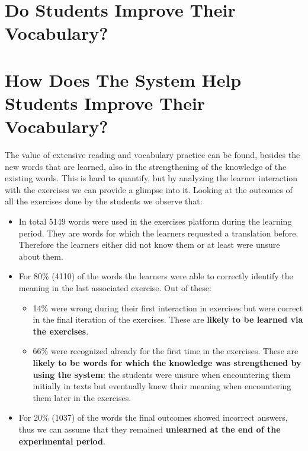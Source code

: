 \begin{added}


\section{Do Students Improve Their Vocabulary?}
\section{How Does The System Help Students Improve Their Vocabulary?}

  The value of extensive reading and vocabulary practice can be found, besides the new words that are learned, also in the strengthening of the knowledge of the existing words. This is hard to quantify, but by analyzing the learner interaction with the exercises we can provide a glimpse into it. Looking at the outcomes of all the exercises done by the students we observe that:

  \begin{itemize}
    \item In total 5149 words were used in the exercises platform during the learning period. They are words for which the learners requested a translation before. Therefore the learners either did not know them or at least were unsure about them.

    \item For 80\% (4110) of the words the learners were able to correctly identify the meaning in the last associated exercise. Out of these: 

    \begin{itemize}
      \item 14\% were wrong during their first interaction in exercises but were correct in the final iteration of the exercises. These are {\bf likely to be learned via the exercises}.

      \item 66\% were recognized already for the first time in the exercises. These are {\bf likely to be words for which the knowledge was strengthened by using the system}: the students were unsure when encountering them initially in texts but eventually knew their meaning when encountering them later in the exercises. 
    \end{itemize}

    \item For 20\% (1037) of the words the final outcomes showed incorrect answers, thus we can assume that they remained {\bf unlearned at the end of the experimental period}.

  \end{itemize}

\end{added}









